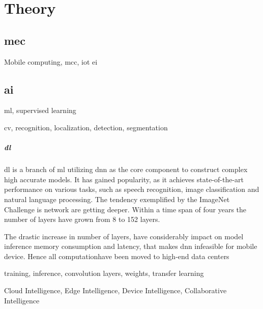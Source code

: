 \chapter{Theory}

\section{\gls{mec}}

Mobile computing, \gls{mcc}, \gls{iot} \gls{ei}

\section{\gls{ai}}

\gls{ml}, supervised learning

\gls{cv}, recognition, localization, detection, segmentation

\paragraph{\gls{dl}} 

\gls{dl} is a branch of \gls{ml} utilizing \gls{dnn} as the core component to construct complex high accurate models. It has gained popularity, as it achieves state-of-the-art performance on various tasks, such as speech recognition, image classification and natural language processing. The tendency exemplified by the ImageNet Challenge \cite{russakovsky_imagenet_2015} is network are getting deeper. Within a time span of four years the number of layers have grown from 8 to 152 layers. 

The drastic increase in number of layers, have considerably impact on model inference memory consumption and latency, that makes \gls{dnn} infeasible for mobile device. Hence all computationhave been moved to high-end data centers

training, inference, convolution layers, weights, transfer learning 


Cloud Intelligence, Edge Intelligence, Device Intelligence, Collaborative Intelligence
